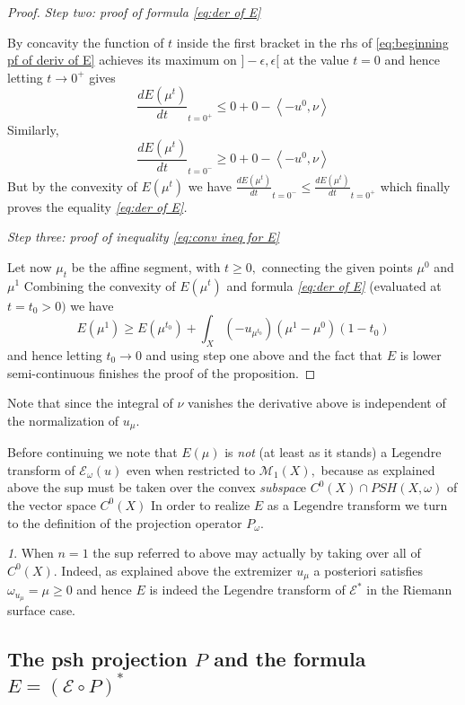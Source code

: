 \documentclass[11pt,oneside,english]{amsart}
\numberwithin{equation}{section}
\numberwithin{figure}{section}
\theoremstyle{plain}
\theoremstyle{plain}
\theoremstyle{plain}
\theoremstyle{plain}
\theoremstyle{remark}
\newtheorem{rem}[thm]{\protect\remarkname}
\theoremstyle{definition}
\providecommand{\remarkname}{Remark}
\begin{document}
\begin{proof}
\emph{Step two: proof of formula \ref{eq:der of E}}

By concavity the function of $t$ inside the first bracket in the
rhs of \ref{eq:beginning pf of deriv of E} achieves its maximum on
$]-\epsilon,\epsilon[$ at the value $t=0$ and hence letting $t\rightarrow0^{+}$
gives 
\[
\frac{dE(\mu^{t})}{dt}_{t=0^{+}}\leq0+0-\left\langle -u^{0},\nu\right\rangle 
\]
 Similarly, 
\[
\frac{dE(\mu^{t})}{dt}_{t=0^{-}}\geq0+0-\left\langle -u^{0},\nu\right\rangle 
\]
 But by the convexity of $E(\mu^{t})$ we have $\frac{dE(\mu^{t})}{dt}_{t=0^{-}}\leq\frac{dE(\mu^{t})}{dt}_{t=0^{+}}$
which finally proves the equality \emph{\ref{eq:der of E}.}

\emph{Step three: proof of inequality \ref{eq:conv ineq for E}}

Let now $\mu_{t}$ be the affine segment, with $t\geq0,$ connecting
the given points $\mu^{0}$ and $\mu^{1}$ Combining the convexity
of $E(\mu^{t})$ and formula \emph{\ref{eq:der of E}} (evaluated
at $t=t_{0}>0)$ we have 
\[
E(\mu^{1})\geq E(\mu^{t_{0}})+\int_{X}(-u_{\mu^{t_{0}}})(\mu^{1}-\mu^{0})(1-t_{0})
\]
 and hence letting $t_{0}\rightarrow0$ and using step one above and
the fact that $E$ is lower semi-continuous finishes the proof of
the proposition. 
\end{proof}
Note that since the integral of $\nu$ vanishes the derivative above
is independent of the normalization of $u_{\mu}$.

Before continuing we note that $E(\mu)$ is \emph{not} (at least as
it stands) a Legendre transform of $\mathcal{E}_{\omega}(u)$ even
when restricted to $\mathcal{M}_{1}(X),$ because as explained above
the sup must be taken over the convex \emph{subspac}e $C^{0}(X)\cap PSH(X,\omega)$
of the vector space $C^{0}(X)$ In order to realize $E$ as a Legendre
transform we turn to the definition of the projection operator $P_{\omega}.$ 
\begin{rem}
\label{rem:legendre when n is one}When $n=1$ the sup referred to
above may actually by taking over all of $C^{0}(X).$ Indeed, as explained
above the extremizer $u_{\mu}$ a posteriori satisfies $\omega_{u_{\mu}}=\mu\geq0$
and hence $E$ is indeed the Legendre transform of $\mathcal{E}^{*}$
in the Riemann surface case. 
\end{rem}

\subsection{\label{sub:The-psh-projection}The psh projection $P$ and the formula
$E=(\mathcal{E}\circ P)^{*}$ }
\end{document}
